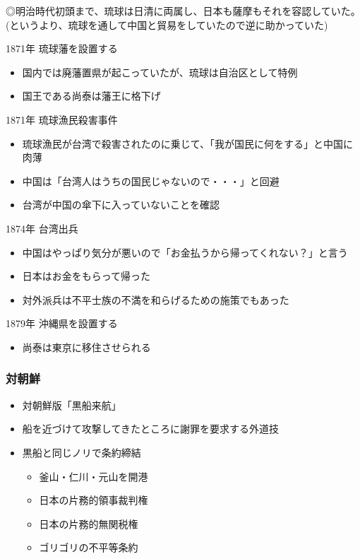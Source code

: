 \documentclass[12pt]{ltjsarticle}
\begin{document}
◎明治時代初頭まで、琉球は日清に両属し、日本も薩摩もそれを容認していた。
(というより、琉球を通して中国と貿易をしていたので逆に助かっていた)

1871年 琉球藩を設置する
\begin{itemize}
\item 国内では廃藩置県が起こっていたが、琉球は自治区として特例
\item 国王である尚泰は藩王に格下げ
\end{itemize}
1871年 琉球漁民殺害事件
\begin{itemize}
\item 琉球漁民が台湾で殺害されたのに乗じて、「我が国民に何をする」と中国に肉薄
\item 中国は「台湾人はうちの国民じゃないので・・・」と回避
\item 台湾が中国の傘下に入っていないことを確認
\end{itemize}
1874年 台湾出兵
\begin{itemize}
\item 中国はやっぱり気分が悪いので「お金払うから帰ってくれない？」と言う
\item 日本はお金をもらって帰った
\item 対外派兵は不平士族の不満を和らげるための施策でもあった
\end{itemize}
1879年 沖縄県を設置する
\begin{itemize}
\item 尚泰は東京に移住させられる
\end{itemize}

\subsubsection{対朝鮮}
\begin{itemize}
\item 対朝鮮版「黒船来航」
\item 船を近づけて攻撃してきたところに謝罪を要求する外道技
\item 黒船と同じノリで条約締結

\begin{itemize}
\item 釜山・仁川・元山を開港
\item 日本の片務的領事裁判権
\item 日本の片務的無関税権
\item ゴリゴリの不平等条約
\end{itemize}
\end{itemize}
\end{document}
